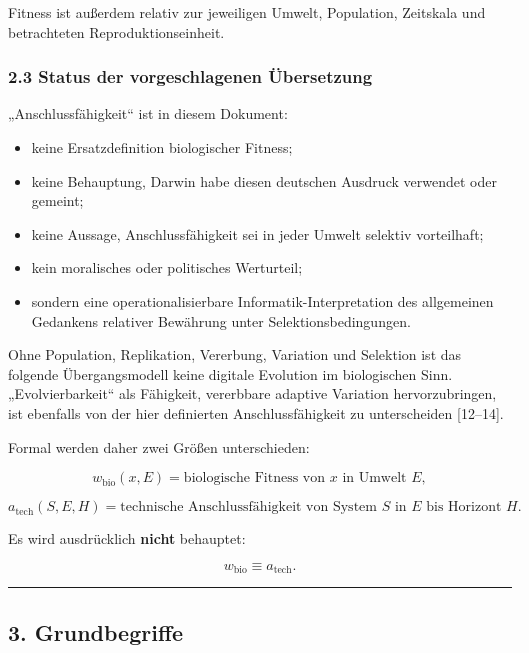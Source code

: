 \documentclass[
  10pt,
  a4paper,
]{article}
\providecommand{\tightlist}{%
  \setlength{\itemsep}{0pt}\setlength{\parskip}{0pt}}
\begin{document}
Fitness ist außerdem relativ zur jeweiligen Umwelt, Population,
Zeitskala und betrachteten Reproduktionseinheit.

\hypertarget{status-der-vorgeschlagenen-uxfcbersetzung}{%
\subsubsection{2.3 Status der vorgeschlagenen
Übersetzung}\label{status-der-vorgeschlagenen-uxfcbersetzung}}

„Anschlussfähigkeit`` ist in diesem Dokument:

\begin{itemize}
\tightlist
\item
  keine Ersatzdefinition biologischer Fitness;
\item
  keine Behauptung, Darwin habe diesen deutschen Ausdruck verwendet oder
  gemeint;
\item
  keine Aussage, Anschlussfähigkeit sei in jeder Umwelt selektiv
  vorteilhaft;
\item
  kein moralisches oder politisches Werturteil;
\item
  sondern eine operationalisierbare Informatik-Interpretation des
  allgemeinen Gedankens relativer Bewährung unter Selektionsbedingungen.
\end{itemize}

Ohne Population, Replikation, Vererbung, Variation und Selektion ist das
folgende Übergangsmodell keine digitale Evolution im biologischen Sinn.
„Evolvierbarkeit`` als Fähigkeit, vererbbare adaptive Variation
hervorzubringen, ist ebenfalls von der hier definierten
Anschlussfähigkeit zu unterscheiden {[}12--14{]}.

Formal werden daher zwei Größen unterschieden:

\[
w_{\mathrm{bio}}(x,E)
=
\text{biologische Fitness von }x\text{ in Umwelt }E,
\]

\[
a_{\mathrm{tech}}(S,E,H)
=
\text{technische Anschlussfähigkeit von System }S
\text{ in }E\text{ bis Horizont }H.
\]

Es wird ausdrücklich \textbf{nicht} behauptet:

\[
w_{\mathrm{bio}} \equiv a_{\mathrm{tech}}.
\]

\begin{center}\rule{0.5\linewidth}{0.5pt}\end{center}

\hypertarget{grundbegriffe}{%
\subsection{3. Grundbegriffe}\label{grundbegriffe}}
\end{document}
